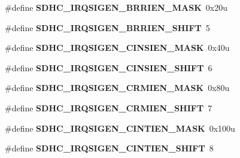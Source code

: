 \begin{DoxyCompactItemize}
\item 
\hypertarget{group___s_d_h_c___register___masks_gaa35b18361378457cf175e01abab26611}{}\#define {\bfseries S\+D\+H\+C\+\_\+\+I\+R\+Q\+S\+I\+G\+E\+N\+\_\+\+B\+R\+R\+I\+E\+N\+\_\+\+M\+A\+S\+K}~0x20u\label{group___s_d_h_c___register___masks_gaa35b18361378457cf175e01abab26611}

\item 
\hypertarget{group___s_d_h_c___register___masks_ga2911f1a96022342a85da7994dff2a5d9}{}\#define {\bfseries S\+D\+H\+C\+\_\+\+I\+R\+Q\+S\+I\+G\+E\+N\+\_\+\+B\+R\+R\+I\+E\+N\+\_\+\+S\+H\+I\+F\+T}~5\label{group___s_d_h_c___register___masks_ga2911f1a96022342a85da7994dff2a5d9}

\item 
\hypertarget{group___s_d_h_c___register___masks_gaddc99f9affd2d06d74e504cb80c3c176}{}\#define {\bfseries S\+D\+H\+C\+\_\+\+I\+R\+Q\+S\+I\+G\+E\+N\+\_\+\+C\+I\+N\+S\+I\+E\+N\+\_\+\+M\+A\+S\+K}~0x40u\label{group___s_d_h_c___register___masks_gaddc99f9affd2d06d74e504cb80c3c176}

\item 
\hypertarget{group___s_d_h_c___register___masks_gafab5ab5bba2d9d1148ad0434126f1fb2}{}\#define {\bfseries S\+D\+H\+C\+\_\+\+I\+R\+Q\+S\+I\+G\+E\+N\+\_\+\+C\+I\+N\+S\+I\+E\+N\+\_\+\+S\+H\+I\+F\+T}~6\label{group___s_d_h_c___register___masks_gafab5ab5bba2d9d1148ad0434126f1fb2}

\item 
\hypertarget{group___s_d_h_c___register___masks_gaafb12fb025305f900bdf9df041dca2b3}{}\#define {\bfseries S\+D\+H\+C\+\_\+\+I\+R\+Q\+S\+I\+G\+E\+N\+\_\+\+C\+R\+M\+I\+E\+N\+\_\+\+M\+A\+S\+K}~0x80u\label{group___s_d_h_c___register___masks_gaafb12fb025305f900bdf9df041dca2b3}

\item 
\hypertarget{group___s_d_h_c___register___masks_ga2a4ce3b87ba3791caee5355e441fc00b}{}\#define {\bfseries S\+D\+H\+C\+\_\+\+I\+R\+Q\+S\+I\+G\+E\+N\+\_\+\+C\+R\+M\+I\+E\+N\+\_\+\+S\+H\+I\+F\+T}~7\label{group___s_d_h_c___register___masks_ga2a4ce3b87ba3791caee5355e441fc00b}

\item 
\hypertarget{group___s_d_h_c___register___masks_gad9ffbe51e814a8ece8a5c12e0ebd0ba3}{}\#define {\bfseries S\+D\+H\+C\+\_\+\+I\+R\+Q\+S\+I\+G\+E\+N\+\_\+\+C\+I\+N\+T\+I\+E\+N\+\_\+\+M\+A\+S\+K}~0x100u\label{group___s_d_h_c___register___masks_gad9ffbe51e814a8ece8a5c12e0ebd0ba3}

\item 
\hypertarget{group___s_d_h_c___register___masks_ga5dabd6ab59c1c4ab26de59aae2c42235}{}\#define {\bfseries S\+D\+H\+C\+\_\+\+I\+R\+Q\+S\+I\+G\+E\+N\+\_\+\+C\+I\+N\+T\+I\+E\+N\+\_\+\+S\+H\+I\+F\+T}~8\label{group___s_d_h_c___register___masks_ga5dabd6ab59c1c4ab26de59aae2c42235}


\end{DoxyCompactItemize}
